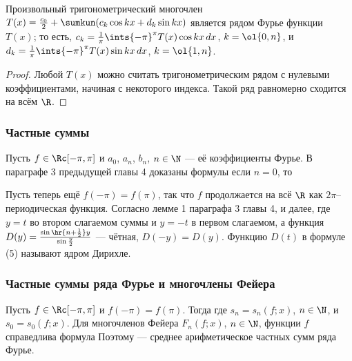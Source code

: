 \documentclass[a4paper]{article}
\begin{document}
\begin{imp}
Произвольный тригонометрический многочлен $T(x) = \frac{c_0}2 +
\sumkun(c_k\cos kx + d_k\sin kx)$ является рядом Фурье функции
$T(x)$; то есть, $c_k = \frac1{\pi} \ints{-\pi}^{\pi} T(x) \cos
kx\,dx$, $k=\ol{0,n}$, и $d_k = \frac1{\pi} \ints{-\pi}^{\pi} T(x)
\sin kx \,dx$, $k=\ol{1,n}$.
\end{imp}

\begin{proof}
Любой $T(x)$ можно считать тригонометрическим рядом с нулевыми
коэффициентами, начиная с некоторого индекса. Такой ряд равномерно
сходится на всём $\R$.
\end{proof}

\subsubsection{Частные суммы}

Пусть $f\in\Rc[-\pi,\pi]$ и $a_0$, $a_n$, $b_n$, $n\in\N$ --- её
коэффициенты Фурье. В параграфе 3 предыдущей главы 4 доказаны
формулы 
если $n=0$, то 

Пусть теперь ещё $f(-\pi) = f(\pi)$, так что $f$ продолжается на всё
$\R$ как $2\pi$--периодическая функция. Согласно лемме 1 параграфа 3
главы 4,  и далее,  где $y=t$ во втором
слагаемом суммы и $y=-t$ в первом слагаемом, а функция $D(y) =
\frac{\sin\hr{n+\frac12}y}{\sin\frac{y}2}$ --- чётная, $D(-y)=D(y)$.
Функцию $D(t)$ в формуле (5) называют ядром Дирихле.

\subsubsection{Частные суммы ряда Фурье и многочлены Фейера}

Пусть $f\in\Rc[-\pi,\pi]$ и $f(-\pi)=f(\pi)$. Тогда  где $s_n = s_n(f;x)$,
$n\in\N$, и $s_0 = s_0(f;x)$. Для многочленов Фейера $F_n(f;x)$,
$n\in\N$, функции $f$ справедлива формула  Поэтому  --- среднее
арифметическое частных сумм ряда Фурье.
\end{document}
